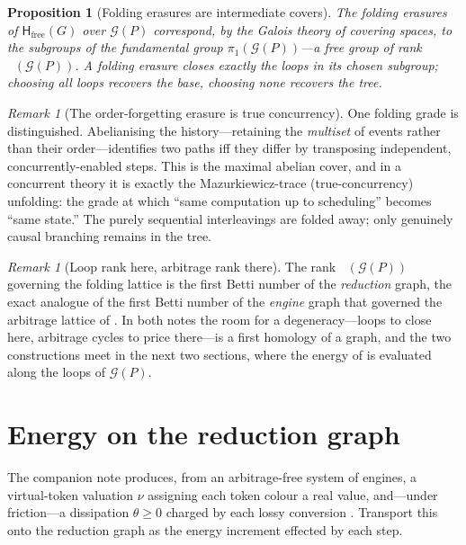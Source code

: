 \documentclass[11pt]{article}
\theoremstyle{definition}
\theoremstyle{plain}
\newtheorem{proposition}[definition]{Proposition}
\theoremstyle{remark}
\newtheorem{remark}[definition]{Remark}
\newcommand{\hist}{\mathsf{H}}
\newcommand{\Grph}{\mathcal{G}}
\newcommand{\fund}{\pi_1}
\DeclareMathOperator{\Betti}{b_1}
\begin{document}
\begin{proposition}[Folding erasures are intermediate covers]\label{prop:galois}
The folding erasures of $\hist_{\mathrm{free}}(G)$ over $\Grph(P)$ correspond, by the Galois theory
of covering spaces, to the subgroups of the fundamental group $\fund(\Grph(P))$---a free group of
rank $\Betti(\Grph(P))$. A folding erasure closes exactly the loops in its chosen subgroup;
choosing all loops recovers the base, choosing none recovers the tree.
\end{proposition}

\begin{remark}[The order-forgetting erasure is true concurrency]\label{rmk:mazurkiewicz}
One folding grade is distinguished. Abelianising the history---retaining the \emph{multiset} of
events rather than their order---identifies two paths iff they differ by transposing independent,
concurrently-enabled steps. This is the maximal abelian cover, and in a concurrent theory it is
exactly the Mazurkiewicz-trace \cite{Mazurkiewicz} (true-concurrency) unfolding: the grade at which
``same computation up to scheduling'' becomes ``same state.'' The purely sequential interleavings
are folded away; only genuinely causal branching remains in the tree.
\end{remark}

\begin{remark}[Loop rank here, arbitrage rank there]
The rank $\Betti(\Grph(P))$ governing the folding lattice is the first Betti number of the
\emph{reduction} graph, the exact analogue of the first Betti number of the \emph{engine} graph
that governed the arbitrage lattice of \cite[Prop.~4.3]{VT}. In both notes the room for a
degeneracy---loops to close here, arbitrage cycles to price there---is a first homology of a graph,
and the two constructions meet in the next two sections, where the energy of \cite{VT} is evaluated
along the loops of $\Grph(P)$.
\end{remark}

\section{Energy on the reduction graph}
\label{sec:energy}

The companion note \cite{VT} produces, from an arbitrage-free system of engines, a virtual-token
valuation $\nu$ assigning each token colour a real value, and---under friction---a dissipation
$\theta\ge 0$ charged by each lossy conversion \cite[\S7]{VT}. Transport this onto the reduction
graph as the energy increment effected by each step.
\end{document}
